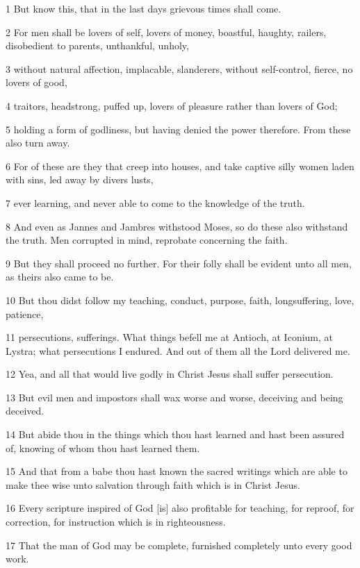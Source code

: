 \par 1 But know this, that in the last days grievous times shall come.
\par 2 For men shall be lovers of self, lovers of money, boastful, haughty, railers, disobedient to parents, unthankful, unholy,
\par 3 without natural affection, implacable, slanderers, without self-control, fierce, no lovers of good,
\par 4 traitors, headstrong, puffed up, lovers of pleasure rather than lovers of God;
\par 5 holding a form of godliness, but having denied the power therefore. From these also turn away.
\par 6 For of these are they that creep into houses, and take captive silly women laden with sins, led away by divers lusts,
\par 7 ever learning, and never able to come to the knowledge of the truth.
\par 8 And even as Jannes and Jambres withstood Moses, so do these also withstand the truth. Men corrupted in mind, reprobate concerning the faith.
\par 9 But they shall proceed no further. For their folly shall be evident unto all men, as theirs also came to be.
\par 10 But thou didst follow my teaching, conduct, purpose, faith, longsuffering, love, patience,
\par 11 persecutions, sufferings. What things befell me at Antioch, at Iconium, at Lystra; what persecutions I endured. And out of them all the Lord delivered me.
\par 12 Yea, and all that would live godly in Christ Jesus shall suffer persecution.
\par 13 But evil men and impostors shall wax worse and worse, deceiving and being deceived.
\par 14 But abide thou in the things which thou hast learned and hast been assured of, knowing of whom thou hast learned them.
\par 15 And that from a babe thou hast known the sacred writings which are able to make thee wise unto salvation through faith which is in Christ Jesus.
\par 16 Every scripture inspired of God [is] also profitable for teaching, for reproof, for correction, for instruction which is in righteousness.
\par 17 That the man of God may be complete, furnished completely unto every good work.


